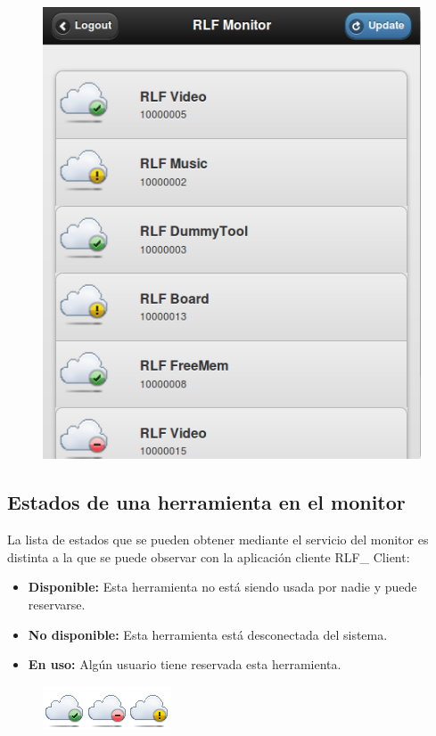 \begin{figure}[H]
	\centering
	\includegraphics[scale=0.5]{images/user/monitor.png}
\end{figure}

\subsection*{Estados de una herramienta en el monitor}
La lista de estados que se pueden obtener mediante el servicio del 
monitor es distinta a la que se puede observar con la aplicación 
cliente RLF\_ Client:

\begin{itemize}
\item \textbf{Disponible:} Esta herramienta no está siendo usada por nadie y 
puede reservarse. 
\item \textbf{No disponible:} Esta herramienta está desconectada del sistema.
\item \textbf{En uso:} Algún usuario tiene reservada esta herramienta.
\end{itemize}

\begin{figure}[h]
	\centering
	\includegraphics[scale=1]{images/user/statustoolsmonitor.png}
\end{figure}

\cleardoublepage
